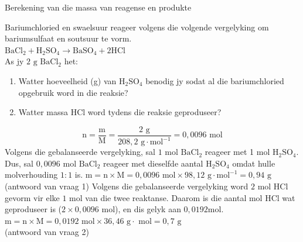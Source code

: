       \begin{wex}{ Berekening van die massa van reagense en produkte }
{
      \label{m38717*id279063}Bariumchloried en swaelsuur reageer volgens die volgende vergelyking om bariumsulfaat en soutsuur te vorm.\\
      \label{m38717*id279070}
        ${\text{BaCl}}_{2}+{\text{H}}_{2}{\text{SO}}_{4}\to {\text{BaSO}}_{4}+2\text{HCl}$
      \\
      \label{m38717*id279141}As jy $2 \text{ g}$ $\text{BaCl}{}_{2}$ het:
      \label{m38717*id279158}\begin{enumerate}[noitemsep, label=\textbf{\arabic*}. ] 
\item Watter hoeveelheid (g) van $\text{H}{}_{2}\text{SO}{}_{4}$ benodig jy sodat al die bariumchloried opgebruik word in die reaksie?
\item Watter massa $\text{HCl}$ word tydens die reaksie geproduseer?
\end{enumerate}     
}
{
        
    \begin{equation*}
    \text{n}=\frac{\text{m}}{\text{M}}=\frac{2 \text{ g}}{208,2 \text{ g} \cdot \text{mol}^{-1}}=0,0096 \text{ mol}
      \end{equation*}
      \label{m38717*id279344}Volgens die gebalanseerde vergelyking, sal $1$ mol $\text{BaCl}{}_{2}$ reageer met 1 mol $\text{H}{}_{2}\text{SO}{}_{4}$. Dus, sal $0,0096 \text{ mol}$ $\text{BaCl}{}_{2}$ reageer met dieselfde aantal $\text{H}{}_{2}\text{SO}{}_{4}$ omdat hulle molverhouding $1:1$ is.
$ \text{m}=\text{n} \times \text{M} = 0,0096 \text{ mol} \times 98,12 \text{ g} \cdot \text{mol}^{-1} = 0,94 \text{ g}$ \\(antwoord van vraag 1) 
      \label{m38717*id279513}Volgens die gebalanseerde vergelyking word $2$ mol $\text{HCl}$ gevorm vir elke $1$ mol van die twee reaktanse. Daarom is die aantal mol $\text{HCl}$ wat geproduseer is ($2 \times 0,0096 \text{ mol}$), en dis gelyk aan $0,0192 \text{mol}$.
   $\text{m}=\text{n} \times \text{M} = 0,0192 \text{ mol} \times 36,46 \text{ g} \cdot \text{ mol} = 0,7 \text{ g}$\\
(antwoord van vraag 2) 
}
    \end{wex}
    \noindent

